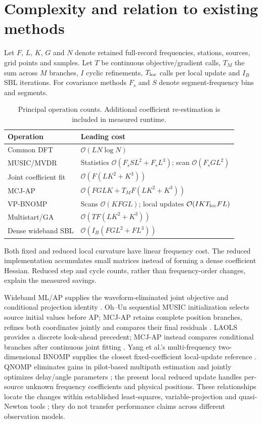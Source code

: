 \documentclass[a4paper,12pt,review]{cas-sc}
\begin{document}
\section{Complexity and relation to existing methods}
Let $F$, $L$, $K$, $G$ and $N$ denote retained full-record frequencies, stations, sources, grid points and samples. Let $T$ be continuous objective/gradient calls, $T_M$ the sum across $M$ branches, $I$ cyclic refinements, $T_{\rm loc}$ calls per local update and $I_B$ SBL iterations. For covariance methods $F_s$ and $S$ denote segment-frequency bins and segments.
\begin{table}[pos=H]\centering\small
\caption{Principal operation counts. Additional coefficient re-estimation is included in measured runtime.}\label{sup:complexity}
\begin{tabularx}{\linewidth}{@{}lX@{}}\toprule
Operation & Leading cost\\\midrule
Common DFT & $\mathcal O(LN\log N)$\\
MUSIC/MVDR & Statistics $\mathcal O(F_sSL^2+F_sL^3)$; scan $\mathcal O(F_sGL^2)$\\
Joint coefficient fit & $\mathcal O(F(LK^2+K^3))$\\
MCJ-AP & $\mathcal O(FGLK+T_MF(LK^2+K^3))$\\
VP-BNOMP & Scans $\mathcal O(KFGL)$; local updates $\mathcal O(IKT_{\rm loc}FL)$\\
Multistart/GA & $\mathcal O(TF(LK^2+K^3))$\\
Dense wideband SBL & $\mathcal O(I_B(FGL^2+FL^3))$\\\bottomrule
\end{tabularx}\end{table}
Both fixed and reduced local curvature have linear frequency cost. The reduced implementation accumulates small matrices instead of forming a dense coefficient Hessian. Reduced step and cycle counts, rather than frequency-order changes, explain the measured savings.

Wideband ML/AP supplies the waveform-eliminated joint objective and conditional projection identity \cite{ChenHudsonYao2002}. Oh--Un sequential MUSIC initialization selects source initial values before AP; MCJ-AP retains complete position branches, refines both coordinates jointly and compares their final residuals \cite{OhUn1991}. LAOLS provides a discrete look-ahead precedent; MCJ-AP instead compares conditional branches after continuous joint fitting \cite{Chatterjee2012}. Yang et al.'s multi-frequency two-dimensional BNOMP supplies the closest fixed-coefficient local-update reference \cite{Yang2022}. QNOMP eliminates gains in pilot-based multipath estimation and jointly optimizes delay/angle parameters \cite{Zeng2025}; the present local reduced update handles per-source unknown frequency coefficients and physical positions. These relationships locate the changes within established least-squares, variable-projection and quasi-Newton tools \cite{GolubPereyra1973,Byrd1995}; they do not transfer performance claims across different observation models.
\end{document}
